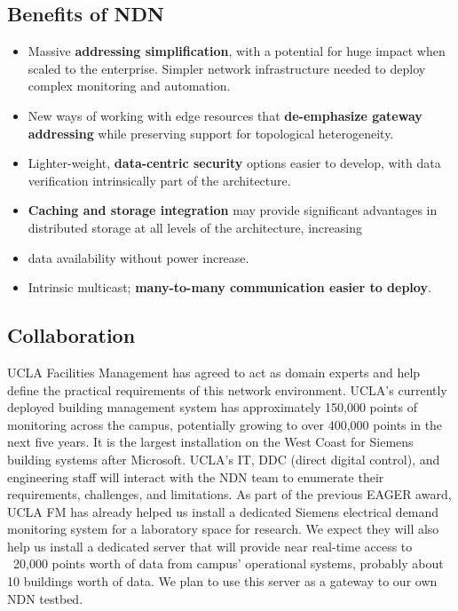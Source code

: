 \subsection{Benefits of NDN}

\begin{itemize}
\item Massive \textbf{addressing simplification}, with a potential for huge impact when scaled to the enterprise. Simpler network infrastructure needed to deploy complex monitoring and automation. 
\item New ways of working with edge resources that \textbf{de-emphasize gateway addressing} while preserving support for topological heterogeneity. 
\item Lighter-weight, \textbf{data-centric security} options easier to develop, with data verification intrinsically part of the architecture. 
\item \textbf{Caching and storage integration} may provide significant advantages in distributed storage at all levels of the architecture, increasing \item data availability without power increase. 
\item Intrinsic multicast; \textbf{many-to-many communication easier to deploy}. 
\end{itemize}

\subsection{Collaboration}

UCLA Facilities Management has agreed to act as domain experts and help define the practical requirements of this network environment.  UCLA's currently deployed building management system has approximately 150,000 points of monitoring across the campus, potentially growing to over 400,000 points in the next five years.  It is the largest installation on the West Coast for Siemens building systems after Microsoft.  UCLA's IT, DDC (direct digital control), and engineering staff will interact with the NDN team to enumerate their requirements, challenges, and limitations.  As part of the previous EAGER award, UCLA FM has already helped us install a dedicated Siemens electrical demand monitoring system for a laboratory space for research.  We expect they will also help us install a dedicated server that will provide near real-time access to ~20,000 points worth of data from campus' operational systems, probably about 10 buildings worth of data.  We plan to use this server as a gateway to our own NDN testbed. 

